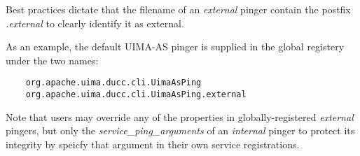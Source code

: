     Best practices dictate that the filename of an {\em external} pinger contain the
    postfix {\em .external} to clearly identify it as external.  

    As an example, the default UIMA-AS pinger is supplied in the global registery
    under the two names:
\begin{verbatim}
    org.apache.uima.ducc.cli.UimaAsPing
    org.apache.uima.ducc.cli.UimaAsPing.external
\end{verbatim}

    Note that users may override any of the properties in globally-registered
    {\em external} pingers, but only the {\em service\_ping\_arguments} of an {\em internal}
    pinger to protect its integrity by speicfy that argument in their own
    service registrations.

